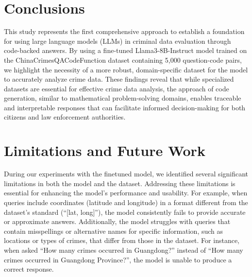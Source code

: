 
\section{Conclusions}



This study represents the first comprehensive approach to establish a foundation for using large language models (LLMs) in criminal data evaluation through code-backed answers. By using a fine-tuned Llama3-8B-Instruct model trained on the ChinaCrimesQACodeFunction dataset containing 5,000 question-code pairs, we highlight the necessity of a more robust, domain-specific dataset for the model to accurately analyze crime data. These findings reveal that while specialized datasets are essential for effective crime data analysis, the approach of code generation, similar to mathematical problem-solving domains, enables traceable and interpretable responses that can facilitate informed decision-making for both citizens and law enforcement authorities.



\section{Limitations and Future Work}

During our experiments with the finetuned model, we identified several significant limitations in both the model and the dataset. Addressing these limitations is essential for enhancing the model's performance and usability. For example, when queries include coordinates (latitude and longitude) in a format different from the dataset's standard (``[lat, long]''), the model consistently fails to provide accurate or approximate answers. Additionally, the model struggles with queries that contain misspellings or alternative names for specific information, such as locations or types of crimes, that differ from those in the dataset. For instance, when asked ``How many crimes occurred in Guangdong?'' instead of ``How many crimes occurred in Guangdong Province?'', the model is unable to produce a correct response.

